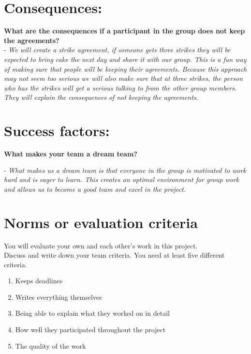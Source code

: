 \section*{\textcolor{Delft_Blue}{\textbf{Consequences:\vspace{5pt}}}}
\textbf{What are the consequences if a participant in the group does not keep the agreements?\\}
    - \textit{We will create a strike agreement, if someone gets three strikes they will be expected to bring cake the next day and share it with our group. This is a fun way of making sure that people will be keeping their agreements. Because this approach may not seem too serious we will also make sure that at three strikes, the person who has the strikes will get a serious talking to from the other group members. They will explain the consequences of not keeping the agreements.}\\

\section*{\textcolor{Delft_Blue}{\textbf{Success factors:\vspace{5pt}}}}
\textbf{What makes your team a dream team? \\}

- \textit{What makes us a dream team is that everyone in the group is motivated to work hard and is eager to learn. This creates an optimal environment for group work and allows us to become a good team and excel in the project.}\\
\newpage
\section*{\textcolor{Delft_Blue}{\textbf{Norms or evaluation criteria\vspace{5pt}}}}
You will evaluate your own and each other's work in this project.\\
Discuss and write down your team criteria. You need at least five different criteria. \\

\begin{enumerate}
    \item Keeps deadlines\\
    \item Writes everything themselves\\
    \item Being able to explain what they worked on in detail\\
    \item How well they participated throughout the project\\
    \item The quality of the work\\
\end{enumerate}

